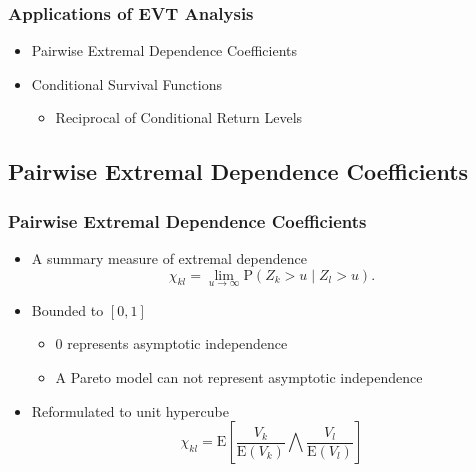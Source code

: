 \documentclass[aspectratio=169]{beamer}
\begin{document}
\begin{frame}
  \frametitle{Applications of EVT Analysis}
  \begin{itemize}
    \item Pairwise Extremal Dependence Coefficients
    \item Conditional Survival Functions
      \begin{itemize}
        \item Reciprocal of Conditional Return Levels
      \end{itemize}
  \end{itemize}
\end{frame}

\subsection{Pairwise Extremal Dependence Coefficients}

\begin{frame}
  \frametitle{Pairwise Extremal Dependence Coefficients}
    \begin{itemize}
      \item A summary measure of extremal dependence
      \begin{equation*}
        \chi_{kl} = \lim\limits_{u\to\infty}\text{P}\left(Z_k > u\mid Z_l > u\right).
      \end{equation*}
      \pause
      \item Bounded to $[0,1]$
        \begin{itemize}
          \item $0$ represents asymptotic independence
          \item A Pareto model can not represent asymptotic independence
        \end{itemize}
      \pause
      \item Reformulated to unit hypercube
        \begin{equation*}
          \chi_{kl} = \text{E}\left[\frac{V_k}{\text{E}(V_k)}{\bigwedge}\frac{V_l}{\text{E}(V_l)}\right]
        \end{equation*}
    \end{itemize}
\end{frame}
\end{document}
